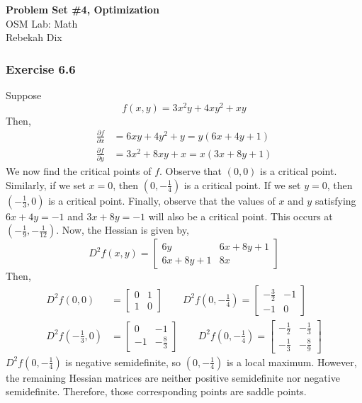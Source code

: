 \documentclass[letterpaper,12pt]{article}
\theoremstyle{definition}
\begin{document}
\begin{flushleft}
  \textbf{\large{Problem Set \#4, Optimization}} \\
  OSM Lab: Math \\
  Rebekah Dix
\end{flushleft}

\vspace{5mm}

\subsubsection*{Exercise 6.6}
Suppose
\begin{equation}
	f(x,y) = 3x^2 y + 4xy^2 + xy 
\end{equation}
Then, 
\begin{align*}
	\frac{\partial f}{\partial x} &= 6xy + 4y^2 + y = y(6x + 4y + 1)\\
	\frac{\partial f}{\partial y} &= 3x^2 + 8xy + x = x(3x + 8y + 1)
\end{align*}
We now find the critical points of $f$. Observe that $(0,0)$ is a critical point. Similarly, if we set $x = 0$, then $(0, -\frac{1}{4})$ is a critical point. If we set $y = 0$, then $(-\frac{1}{3}, 0)$ is a critical point. Finally, observe that the values of $x$ and $y$ satisfying $6x + 4y = -1$ and $3x + 8y = -1$ will also be a critical point. This occurs at $(-\frac{1}{9}, -\frac{1}{12})$. Now, the Hessian is given by,
\begin{equation}
	D^2 f(x,y) = 
	\begin{bmatrix}
	6y & 6x + 8y  + 1\\
	6x + 8y + 1 & 8x
	\end{bmatrix}
\end{equation}
Then, 
\begin{align*}
	D^2f(0,0) &= 
	\begin{bmatrix}
	0 & 1 \\
	1 & 0 
	\end{bmatrix} \qquad
	D^2f(0,-\frac{1}{4}) = 
	\begin{bmatrix}
	-\frac{3}{2} & -1 \\
	-1 & 0 
	\end{bmatrix} \\
	D^2f(-\frac{1}{3},0) &= 
	\begin{bmatrix}
	0 & -1 \\
	-1 & -\frac{8}{3} 
	\end{bmatrix} \qquad
	D^2f(0,-\frac{1}{4}) = 
	\begin{bmatrix}
	-\frac{1}{2} & -\frac{1}{3} \\
	-\frac{1}{3} & -\frac{8}{9} 
	\end{bmatrix} 
\end{align*}
$D^2 f(0, -\frac{1}{4})$ is negative semidefinite, so $(0, -\frac{1}{4})$ is a local maximum. However, the remaining Hessian matrices are neither positive semidefinite nor negative semidefinite. Therefore, those corresponding points are saddle points. 
  
\end{document}
